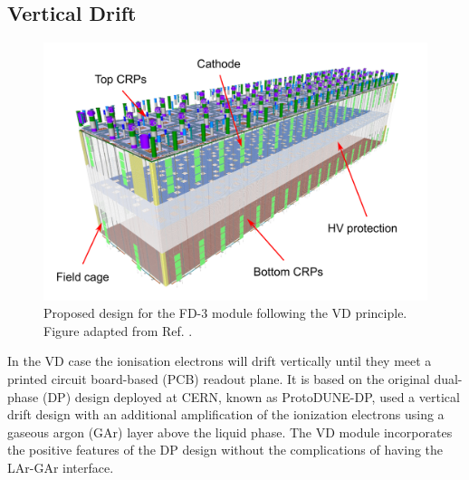 \subsection{Vertical Drift}

\begin{figure}[t]
	\centering
	\includegraphics[width=0.70\linewidth]{Images/DUNE/FD/dune_vd}
	\caption[Proposed design for the FD-3 module following the VD principle.]{Proposed design for the FD-3 module following the VD principle. Figure adapted from Ref. \cite{DUNEVDTDR}.}
	\label{fig:dune_vd}
\end{figure}

In the VD case the ionisation electrons will drift vertically until they meet a printed circuit board-based (PCB) readout plane. It is based on the original dual-phase (DP) design deployed at CERN, known as ProtoDUNE-DP, used a vertical drift design with an additional amplification of the ionization electrons using a gaseous argon (GAr) layer above the liquid phase. The VD module incorporates the positive features of the DP design without the complications of having the LAr-GAr interface.

